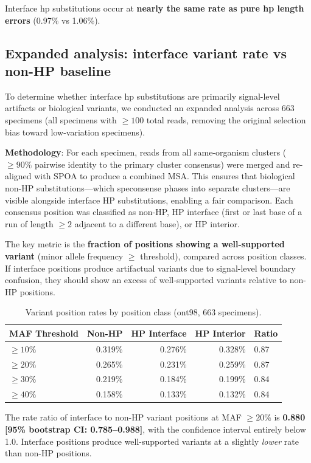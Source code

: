 \documentclass[11pt]{article}
\begin{document}
Interface hp substitutions occur at \textbf{nearly the same rate as pure hp
length errors} (0.97\% vs 1.06\%).

\subsection{Expanded analysis: interface variant rate vs non-HP baseline}

To determine whether interface hp substitutions are primarily signal-level
artifacts or biological variants, we conducted an expanded analysis across 663
specimens (all specimens with $\geq 100$ total reads, removing the original
selection bias toward low-variation specimens).

\textbf{Methodology}: For each specimen, reads from all same-organism clusters
($\geq 90\%$ pairwise identity to the primary cluster consensus) were merged
and re-aligned with SPOA to produce a combined MSA. This ensures that
biological non-HP substitutions---which speconsense phases into separate
clusters---are visible alongside interface HP substitutions, enabling a fair
comparison. Each consensus position was classified as non-HP, HP interface
(first or last base of a run of length $\geq 2$ adjacent to a different base),
or HP interior.

The key metric is the \textbf{fraction of positions showing a well-supported
variant} (minor allele frequency $\geq$ threshold), compared across position
classes. If interface positions produce artifactual variants due to
signal-level boundary confusion, they should show an excess of well-supported
variants relative to non-HP positions.

\begin{table}[h]
\centering
\caption{Variant position rates by position class (ont98, 663 specimens).}
\label{tab:interface_ont98}
\begin{tabular}{lrrrl}
\toprule
MAF Threshold & Non-HP & HP Interface & HP Interior & Ratio \\
\midrule
$\geq 10\%$ & 0.319\% & 0.276\% & 0.328\% & 0.87 \\
$\geq 20\%$ & 0.265\% & 0.231\% & 0.259\% & 0.87 \\
$\geq 30\%$ & 0.219\% & 0.184\% & 0.199\% & 0.84 \\
$\geq 40\%$ & 0.158\% & 0.133\% & 0.132\% & 0.84 \\
\bottomrule
\end{tabular}
\end{table}

The rate ratio of interface to non-HP variant positions at MAF $\geq 20\%$ is
\textbf{0.880 [95\% bootstrap CI: 0.785--0.988]}, with the confidence interval
entirely below 1.0. Interface positions produce well-supported variants at a
slightly \emph{lower} rate than non-HP positions.
\end{document}
